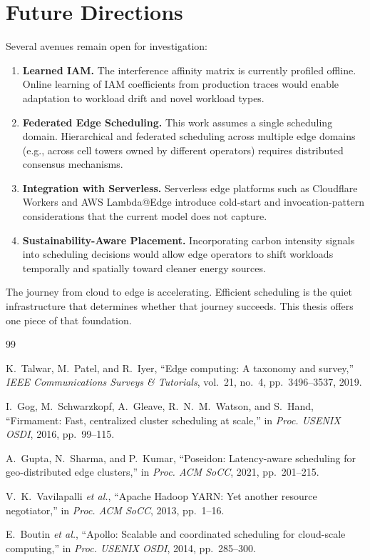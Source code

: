 \section{Future Directions}

Several avenues remain open for investigation:

\begin{enumerate}[leftmargin=*,itemsep=6pt]
    \item \textbf{Learned IAM.} The interference affinity matrix is currently profiled offline. Online learning of IAM coefficients from production traces would enable adaptation to workload drift and novel workload types.

    \item \textbf{Federated Edge Scheduling.} This work assumes a single scheduling domain. Hierarchical and federated scheduling across multiple edge domains (e.g., across cell towers owned by different operators) requires distributed consensus mechanisms.

    \item \textbf{Integration with Serverless.} Serverless edge platforms such as Cloudflare Workers and AWS Lambda@Edge introduce cold-start and invocation-pattern considerations that the current model does not capture.

    \item \textbf{Sustainability-Aware Placement.} Incorporating carbon intensity signals into scheduling decisions would allow edge operators to shift workloads temporally and spatially toward cleaner energy sources.
\end{enumerate}

The journey from cloud to edge is accelerating. Efficient scheduling is the quiet infrastructure that determines whether that journey succeeds. This thesis offers one piece of that foundation.

\begin{thebibliography}{99}

K.~Talwar, M.~Patel, and R.~Iyer,
``Edge computing: A taxonomy and survey,''
\textit{IEEE Communications Surveys \& Tutorials}, vol.~21, no.~4, pp.~3496--3537, 2019.

I.~Gog, M.~Schwarzkopf, A.~Gleave, R.~N.~M.~Watson, and S.~Hand,
``Firmament: Fast, centralized cluster scheduling at scale,''
in \textit{Proc. USENIX OSDI}, 2016, pp.~99--115.

A.~Gupta, N.~Sharma, and P.~Kumar,
``Poseidon: Latency-aware scheduling for geo-distributed edge clusters,''
in \textit{Proc. ACM SoCC}, 2021, pp.~201--215.

V.~K.~Vavilapalli \textit{et al.},
``Apache Hadoop YARN: Yet another resource negotiator,''
in \textit{Proc. ACM SoCC}, 2013, pp.~1--16.

E.~Boutin \textit{et al.},
``Apollo: Scalable and coordinated scheduling for cloud-scale computing,''
in \textit{Proc. USENIX OSDI}, 2014, pp.~285--300.

\end{thebibliography}
